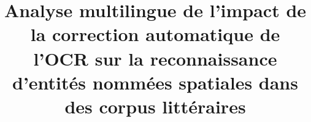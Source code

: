 \documentclass[utf8x]{article-hermes_frenchb}
\title[Contamination des OCR sur la REN]{Analyse multilingue de l'impact de la correction automatique de l'OCR sur la reconnaissance d’entités nommées spatiales dans des corpus littéraires}
\begin{document}
\maketitlepage

\newcommand{\fakesentence}{Attention à ce que les figures et les tableaux ne débordent pas dans les marges. }
\newcommand{\fakeparagraph}{
\fakesentence
\fakesentence
\fakesentence
\fakesentence
\fakesentence
\fakesentence
}

\newcommand{\TAL}{traitement automatique des langues}

\newcommand{\CAD}{c'est-à-dire}
\newcommand{\COLL}{et collègues}
\newcommand{\PEX}{par exemple}
\newcommand{\POPP}{par opposition à}

\newcommand{\cad}{c.-à-d.}
\newcommand{\coll}{et~coll.}
\newcommand{\pex}{p.~ex.}
\newcommand{\popp}{p.~opp.}

%
%
%
%
%
%
%
%
%
%

\label{sec:expe}

%
%



\end{document}
